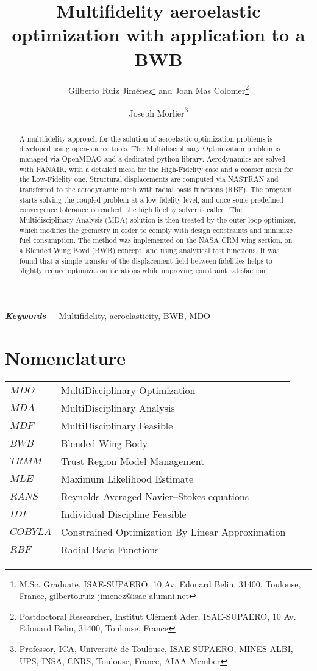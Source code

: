 \documentclass[conf]{new-aiaa}
\title{Multifidelity aeroelastic optimization with application to a BWB}
\author{Gilberto Ruiz Jiménez\footnote{M.Sc. Graduate, ISAE-SUPAERO, 10 Av. Edouard Belin, 31400, Toulouse, France, gilberto.ruiz-jimenez@isae-alumni.net} and Joan Mas Colomer\footnote{Postdoctoral Researcher, Institut Clément Ader, ISAE-SUPAERO, 10 Av. Edouard Belin, 31400, Toulouse, France}}
\affil{ISAE-SUPAERO, Université de Toulouse, Toulouse, France}
\author{Joseph Morlier\footnote{Professor, ICA, Université de Toulouse, ISAE-SUPAERO, MINES ALBI, UPS, INSA, CNRS, Toulouse, France, AIAA Member}}
\affil{ICA, Université de Toulouse, ISAE-SUPAERO, MINES ALBI, UPS, INSA, CNRS, Toulouse, France}
\providecommand{\keywords}[1]
{
  \small	
  \textbf{\textit{Keywords---}} #1
}
\begin{document}
\maketitle

\begin{abstract}
A multifidelity approach for the solution of aeroelastic optimization problems is developed using open-source tools. The Multidisciplinary Optimization problem is managed via OpenMDAO and a dedicated python library. Aerodynamics are solved with PANAIR, with a detailed mesh for the High-Fidelity case and a coarser mesh for the Low-Fidelity one. Structural displacements are computed via NASTRAN and transferred to the aerodynamic mesh with radial basis functions (RBF). The program starts solving the coupled problem at a low fidelity level, and once some predefined convergence tolerance is reached, the high fidelity solver is called. The Multidisciplinary Analysis (MDA) solution is then treated by the outer-loop optimizer, which modifies the geometry in order to comply with design constraints and minimize fuel consumption. The method was implemented on the NASA CRM wing section, on a Blended Wing Boyd (BWB) concept, and using analytical test functions. It was found that a simple transfer of the displacement field between fidelities helps to slightly reduce optimization iterations while improving constraint satisfaction. 
\end{abstract}
\keywords{Multifidelity, aeroelasticity, BWB, MDO}
\newline
\newline
\section{Nomenclature}

{\renewcommand\arraystretch{1.0}
\noindent\begin{longtable*}{@{}l @{\quad=\quad} l@{}}
$MDO$ & MultiDisciplinary Optimization \\
$MDA$ & MultiDisciplinary Analysis \\
$MDF$ & MultiDisciplinary Feasible \\
$BWB$ & Blended Wing Body \\
$TRMM$ & Trust Region Model Management \\
$MLE$ & Maximum Likelihood Estimate \\
$RANS$ & Reynolds-Averaged Navier–Stokes equations \\
$IDF$ & Individual Discipline Feasible \\
$COBYLA$ & Constrained Optimization By Linear Approximation \\
$RBF$ & Radial Basis Functions 
\end{longtable*}}
\end{document}
